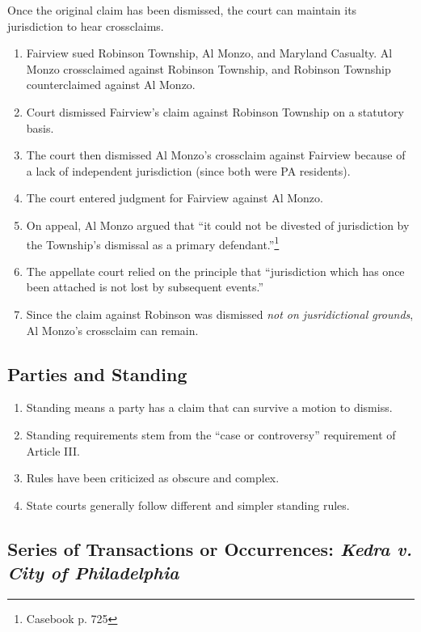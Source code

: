 Once the original claim has been dismissed, the court can maintain its 
jurisdiction to hear crossclaims.

\begin{enumerate}
    \item Fairview sued Robinson Township, Al Monzo, and Maryland Casualty. Al 
    Monzo crossclaimed against Robinson Township, and Robinson Township 
    counterclaimed against Al Monzo.
    \item Court dismissed Fairview's claim against Robinson Township on a 
    statutory basis.
    \item The court then dismissed Al Monzo's crossclaim against Fairview 
    because of a lack of independent jurisdiction (since both were PA 
    residents).
    \item The court entered judgment for Fairview against Al Monzo. 
    \item On appeal, Al Monzo argued that ``it could not be divested of 
    jurisdiction by the Township's dismissal as a primary 
    defendant.''\footnote{Casebook p.  725}
    \item The appellate court relied on the principle that ``jurisdiction 
    which has once been attached is not lost by subsequent events.''
    \item Since the claim against Robinson was dismissed \emph{not on 
    jusridictional grounds}, Al Monzo's crossclaim can remain.
\end{enumerate}

\subsection{Parties and Standing}

\begin{enumerate}
    \item Standing means a party has a claim that can survive a motion to 
    dismiss.
    \item Standing requirements stem from the ``case or controversy'' 
    requirement of Article III.
    \item Rules have been criticized as obscure and complex.
    \item State courts generally follow different and simpler standing rules.
\end{enumerate}

\subsection{Series of Transactions or Occurrences: \emph{Kedra v. City of 
Philadelphia}}

